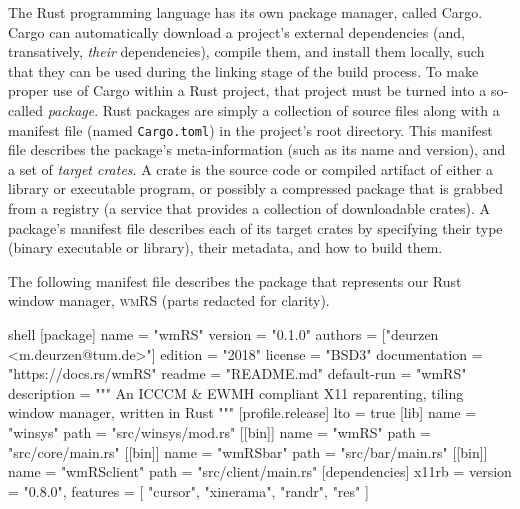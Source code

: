 
The   Rust  programming   language   has  its   own   package  manager,   called
\textup{Cargo}. \textup{Cargo}  can automatically download a  project's external
dependencies (and, transatively, \textit{their} dependencies), compile them, and
install them locally, such that they can be used during the linking stage of the
build process\cite{thecargobook}. To make proper  use of \textup{Cargo} within a
Rust project,  that project  must be turned  into a  so-called \textit{package}.
Rust packages are simply a collection of source files along with a manifest file
(named \texttt{Cargo.toml}) in the project's  root directory. This manifest file
describes the package's  meta-information (such as its name and  version), and a
set of \textit{target crates}\cite{thecargobook}. A  crate is the source code or
compiled  artifact of  either a  library or  executable program,  or possibly  a
compressed package  that is grabbed from  a registry (a service  that provides a
collection of downloadable crates)\cite{thecargobook}. A package's manifest file
describes each of its target crates  by specifying their type (binary executable
or library), their metadata, and how to build them\cite{thecargobook}.

The  following manifest  file describes  the  package that  represents our  Rust
window manager, \textsc{wmRS} (parts redacted for clarity).

\begin{mintedblock}{shell}
  [package]
  name = "wmRS"
  version = "0.1.0"
  authors = ["deurzen <m.deurzen@tum.de>"]
  edition = "2018"
  license = "BSD3"
  documentation = "https://docs.rs/wmRS"
  readme = "README.md"
  default-run = "wmRS"
  description = """
  An ICCCM & EWMH compliant X11 reparenting,
  tiling window manager, written in Rust
  """
  [profile.release]
  lto = true
  [lib]
  name = "winsys"
  path = "src/winsys/mod.rs"
  [[bin]]
  name = "wmRS"
  path = "src/core/main.rs"
  [[bin]]
  name = "wmRSbar"
  path = "src/bar/main.rs"
  [[bin]]
  name = "wmRSclient"
  path = "src/client/main.rs"
  [dependencies]
  x11rb = {
    version = "0.8.0",
    features = [
      "cursor",
      "xinerama",
      "randr",
      "res"
    ]
  }
\end{mintedblock}


